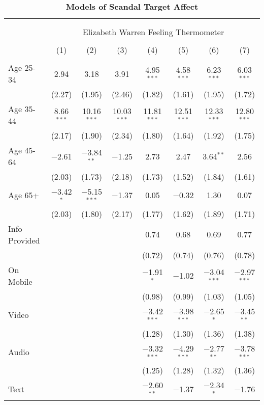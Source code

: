 
\begin{table}[!htbp] \centering 
  \caption{\textbf{Models of Scandal Target Affect}} 
  \label{firststage_feelings} 
\footnotesize 
\begin{tabular}{@{\extracolsep{-2pt}}lccccccc} 
\\[-1.8ex]\hline 
\hline \\[-1.8ex] 
\\[-1.8ex] & \multicolumn{7}{c}{\normalsize Elizabeth Warren Feeling Thermometer} \\ 
\\[-1.8ex] & (1) & (2) & (3) & (4) & (5) & (6) & (7)\\ 
\hline \\[-1.8ex] 
 Age 25-34 & 2.94 & 3.18 & 3.91 & 4.95$^{***}$ & 4.58$^{***}$ & 6.23$^{***}$ & 6.03$^{***}$ \\ 
  & (2.27) & (1.95) & (2.46) & (1.82) & (1.61) & (1.95) & (1.72) \\ 
  Age 35-44 & 8.66$^{***}$ & 10.16$^{***}$ & 10.03$^{***}$ & 11.81$^{***}$ & 12.51$^{***}$ & 12.33$^{***}$ & 12.80$^{***}$ \\ 
  & (2.17) & (1.90) & (2.34) & (1.80) & (1.64) & (1.92) & (1.75) \\ 
  Age 45-64 & $-$2.61 & $-$3.84$^{**}$ & $-$1.25 & 2.73 & 2.47 & 3.64$^{**}$ & 2.56 \\ 
  & (2.03) & (1.73) & (2.18) & (1.73) & (1.52) & (1.84) & (1.61) \\ 
  Age 65+ & $-$3.42$^{*}$ & $-$5.15$^{***}$ & $-$1.37 & 0.05 & $-$0.32 & 1.30 & 0.07 \\ 
  & (2.03) & (1.80) & (2.17) & (1.77) & (1.62) & (1.89) & (1.71) \\ 
  Info Provided &  &  &  & 0.74 & 0.68 & 0.69 & 0.77 \\ 
  &  &  &  & (0.72) & (0.74) & (0.76) & (0.78) \\ 
  On Mobile &  &  &  & $-$1.91$^{*}$ & $-$1.02 & $-$3.04$^{***}$ & $-$2.97$^{***}$ \\ 
  &  &  &  & (0.98) & (0.99) & (1.03) & (1.05) \\ 
  Video &  &  &  & $-$3.42$^{***}$ & $-$3.98$^{***}$ & $-$2.65$^{*}$ & $-$3.45$^{**}$ \\ 
  &  &  &  & (1.28) & (1.30) & (1.36) & (1.38) \\ 
  Audio &  &  &  & $-$3.32$^{***}$ & $-$4.29$^{***}$ & $-$2.77$^{**}$ & $-$3.78$^{***}$ \\ 
  &  &  &  & (1.25) & (1.28) & (1.32) & (1.36) \\ 
  Text &  &  &  & $-$2.60$^{**}$ & $-$1.37 & $-$2.34$^{*}$ & $-$1.76 \\ 

\end{tabular}
\end{table}
